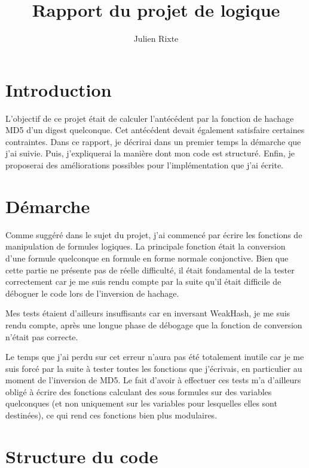 \documentclass{article}
\title{Rapport du projet de logique}
\author{Julien Rixte}
\begin{document}
\maketitle

\section{Introduction}
L'objectif de ce projet était de calculer l'antécédent par la fonction de hachage MD5 d'un digest quelconque. Cet antécédent devait également satisfaire certaines contraintes. 
Dans ce rapport, je décrirai dans un premier temps la démarche que j'ai suivie. Puis, j'expliquerai la manière dont mon code est structuré. Enfin, je proposerai des améliorations possibles pour l'implémentation que j'ai écrite.

\section{Démarche}
Comme suggéré dans le sujet du projet, j'ai commencé par écrire les fonctions de manipulation de formules logiques. La principale fonction était la conversion d'une formule quelconque en formule en forme normale conjonctive. Bien que cette partie ne présente pas de réelle difficulté, il était fondamental de la tester correctement car je me suis rendu compte par la suite qu'il était difficile de déboguer le code lors de l'inversion de hachage. \par

Mes tests étaient d'ailleurs insuffisants car en inversant WeakHash, je me suis rendu compte, après une longue phase de débogage que la fonction de conversion n'était pas correcte. \par

Le temps que j'ai perdu sur cet erreur n'aura pas été totalement inutile car je me suis forcé par la suite à tester toutes les fonctions que j'écrivais, en particulier au moment de l'inversion de MD5. Le fait d'avoir à effectuer ces tests m'a d'ailleurs obligé à écrire des fonctions calculant des sous formules sur des variables quelconques (et non uniquement sur les variables pour lesquelles elles sont destinées), ce qui rend ces fonctions bien plus modulaires.

\section{Structure du code}
\end{document}
